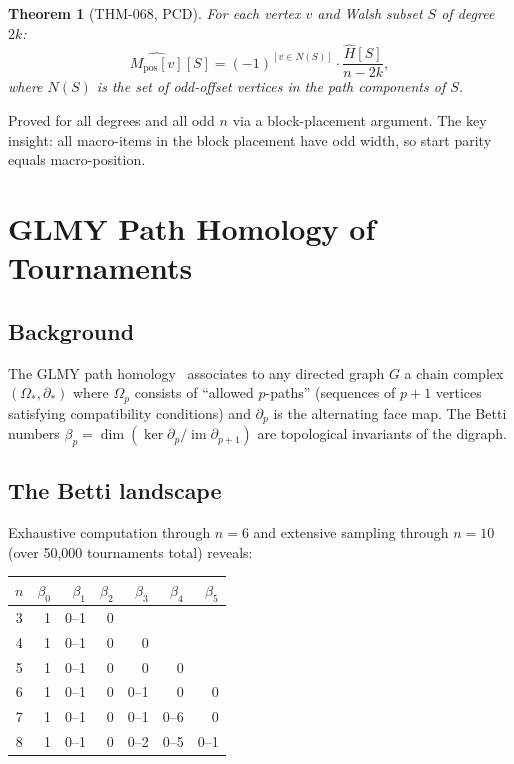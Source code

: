 \documentclass[12pt,reqno]{amsart}
\theoremstyle{plain}
\newtheorem{theorem}{Theorem}[section]
\theoremstyle{definition}
\theoremstyle{remark}
\begin{document}
\begin{theorem}[THM-068, PCD]\label{thm:pcd}
For each vertex $v$ and Walsh subset $S$ of degree $2k$:
\[
\widehat{M_{\mathrm{pos}}[v]}[S] = (-1)^{[v \in N(S)]} \cdot \frac{\hat{H}[S]}{n - 2k},
\]
where $N(S)$ is the set of odd-offset vertices in the path components of $S$.
\end{theorem}

Proved for all degrees and all odd $n$ via a block-placement argument.
The key insight: all macro-items in the block placement have odd width,
so start parity equals macro-position.

\section{GLMY Path Homology of Tournaments}\label{sec:homology}

\subsection{Background}

The GLMY path homology~\cite{GLMY2012} associates to any directed graph $G$
a chain complex $(\Omega_*, \partial_*)$ where $\Omega_p$ consists of
``allowed $p$-paths'' (sequences of $p+1$ vertices satisfying compatibility
conditions) and $\partial_p$ is the alternating face map. The Betti numbers
$\beta_p = \dim(\ker \partial_p / \operatorname{im} \partial_{p+1})$
are topological invariants of the digraph.

\subsection{The Betti landscape}

Exhaustive computation through $n = 6$ and extensive sampling through $n = 10$
(over 50{,}000 tournaments total) reveals:

\begin{center}
\begin{tabular}{@{}crrrrrr@{}}
\toprule
$n$ & $\beta_0$ & $\beta_1$ & $\beta_2$ & $\beta_3$ & $\beta_4$ & $\beta_5$ \\
\midrule
3 & 1 & 0--1 & 0 & & & \\
4 & 1 & 0--1 & 0 & 0 & & \\
5 & 1 & 0--1 & 0 & 0 & 0 & \\
6 & 1 & 0--1 & 0 & 0--1 & 0 & 0 \\
7 & 1 & 0--1 & 0 & 0--1 & 0--6 & 0 \\
8 & 1 & 0--1 & 0 & 0--2 & 0--5 & 0--1 \\
\bottomrule
\end{tabular}
\end{center}
\end{document}
